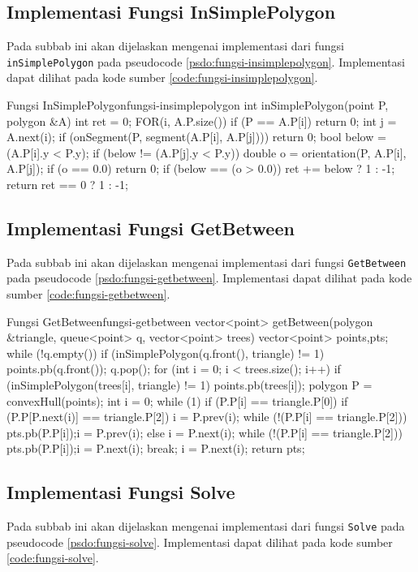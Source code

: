 \subsection{Implementasi Fungsi InSimplePolygon}
Pada subbab ini akan dijelaskan mengenai implementasi dari fungsi \texttt{inSimplePolygon} pada pseudocode \ref{psdo:fungsi-insimplepolygon}. Implementasi dapat dilihat pada kode sumber \ref{code:fungsi-insimplepolygon}.

\begin{code}[firstnumber=1]{Fungsi InSimplePolygon}{fungsi-insimplepolygon}
int inSimplePolygon(point P, polygon &A){
	int ret = 0;
	FOR(i, A.P.size()){
		if (P == A.P[i])
			return 0;
		int j = A.next(i);
		if (onSegment(P, segment(A.P[i], A.P[j])))
			return 0;
		bool below = (A.P[i].y < P.y);
		if (below != (A.P[j].y < P.y)){
			double o = orientation(P, A.P[i], A.P[j]);
			if (o == 0.0)
				return 0;
			if (below == (o > 0.0))
				ret += below ? 1 : -1;
		}
	}
	return ret == 0 ? 1 : -1;
}
\end{code}

\subsection{Implementasi Fungsi GetBetween}
Pada subbab ini akan dijelaskan mengenai implementasi dari fungsi \texttt{GetBetween} pada pseudocode \ref{psdo:fungsi-getbetween}. Implementasi dapat dilihat pada kode sumber \ref{code:fungsi-getbetween}.

\newpage
\begin{code}[firstnumber=1]{Fungsi GetBetween}{fungsi-getbetween}
vector<point> getBetween(polygon &triangle, queue<point> q, vector<point> trees){
	vector<point> points,pts;
	while (!q.empty()){
		if (inSimplePolygon(q.front(), triangle) != 1){
			points.pb(q.front());
		}
		q.pop();
	}
	for (int i = 0; i < trees.size(); i++){
		if (inSimplePolygon(trees[i], triangle) != 1){
			points.pb(trees[i]);
		}
	}
	polygon P = convexHull(points);
	int i = 0;
	while (1){
		if (P.P[i] == triangle.P[0]){
			if (P.P[P.next(i)] == triangle.P[2]){
				i = P.prev(i);
				while (!(P.P[i] == triangle.P[2])){
					pts.pb(P.P[i]);i = P.prev(i);
				}
			}
			else{
				i = P.next(i);
				while (!(P.P[i] == triangle.P[2])){
					pts.pb(P.P[i]);i = P.next(i);
				}
			}
			break;
		}
		i = P.next(i);
	}
	return pts;
}	
\end{code}

\subsection{Implementasi Fungsi Solve}
Pada subbab ini akan dijelaskan mengenai implementasi dari fungsi \texttt{Solve} pada pseudocode \ref{psdo:fungsi-solve}. Implementasi dapat dilihat pada kode sumber \ref{code:fungsi-solve}.

